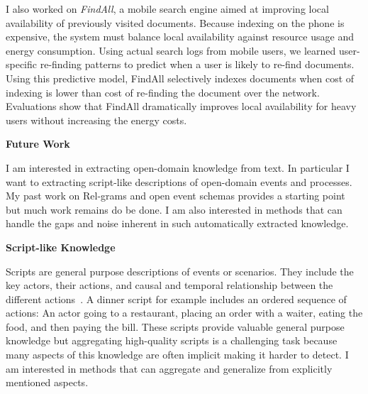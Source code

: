 \documentclass[a4paper,11pt,onecolumn]{article}
\begin{document}
I also worked on {\em FindAll}, a mobile search engine aimed at improving local availability of previously visited documents. Because indexing on the phone is expensive, the system must balance local availability against resource usage and energy consumption. Using actual search logs from mobile users, we learned user-specific re-finding patterns to predict when a user is likely to re-find documents. Using this predictive model, FindAll selectively indexes documents when cost of indexing is lower than cost of re-finding the document over the network. Evaluations show that FindAll dramatically improves local availability for heavy users without increasing the energy costs.

{\bf Future Work}

I am interested in extracting open-domain knowledge from text. In particular I want to extracting script-like descriptions of open-domain events and processes. My past work on Rel-grams and open event schemas provides a starting point but much work remains do be done. I am also interested in methods that can handle the gaps and noise inherent in such automatically extracted knowledge.

{\bf Script-like Knowledge}

Scripts are general purpose descriptions of events or scenarios. They include the key actors, their actions, and causal and temporal relationship between the different actions~\cite{schank-scripts75}. A dinner script for example includes an ordered sequence of actions: An actor going to a restaurant, placing an order with a waiter, eating the food, and then paying the bill. These scripts provide valuable general purpose knowledge but aggregating high-quality scripts is a challenging task because many aspects of this knowledge are often implicit making it harder to detect. I am interested in methods that can aggregate and generalize from explicitly mentioned aspects. %
\end{document}
